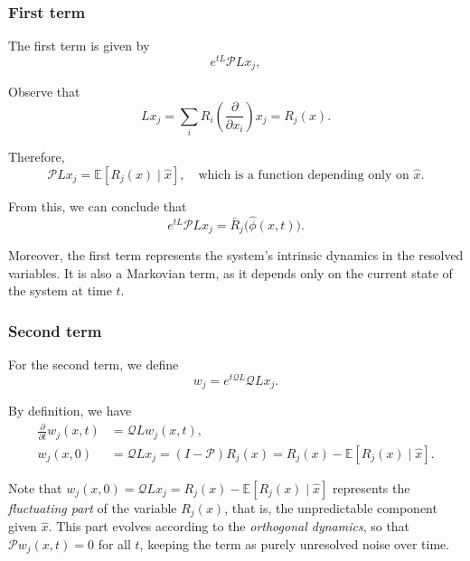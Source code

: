 \documentclass[12pt]{article}
\begin{document}
\subsubsection{First term}
The first term is given by
\begin{equation}
	e^{tL} \mathcal{P}L x_j,
	\label{eq:first-term-mz}
\end{equation}

Observe that
\begin{equation*}
	Lx_j = \sum_i R_i\left(\frac{\partial}{\partial x_i}\right)x_j = R_j(x).
\end{equation*}

Therefore,
\begin{equation*}
	\mathcal{P}Lx_j = \mathbb{E}[R_j(x)\mid \hat{x}], \quad \text{which is a function depending only on $\hat{x}$}.
\end{equation*}

From this, we can conclude that
\begin{equation*}
	e^{tL}\mathcal{P}Lx_j = \bar{R}_j\big(\hat{\phi}(x,t)\big).
\end{equation*}

Moreover, the first term represents the system's intrinsic dynamics in the resolved variables. It is also a Markovian term, as it depends only on the current state of the system at time $t$.

\subsubsection{Second term}
For the second term, we define
\begin{equation*}
	w_j = e^{t\mathcal{Q}L} \mathcal{Q}L x_j.
\end{equation*}

By definition, we have
\begin{align}
	\frac{\partial}{\partial t} w_j(x,t) & = \mathcal{Q}L w_j(x,t),                                                                 \\
	w_j(x,0)                             & = \mathcal{Q}L x_j = (I - \mathcal{P})R_j(x) = R_j(x) - \mathbb{E}[R_j(x) \mid \hat{x}]. 
	\label{eq:mz-orthogonal-dynamics}
\end{align}

Note that $w_j(x,0) = \mathcal{Q}Lx_j = R_j(x) - \mathbb{E}[R_j(x) \mid \hat{x}]$ represents the \textit{fluctuating part} of the variable $R_j(x)$, that is, the unpredictable component given $\hat{x}$. This part evolves according to the \textit{orthogonal dynamics}, so that $\mathcal{P}w_j(x,t) = 0$ for all $t$, keeping the term as purely unresolved noise over time.
\end{document}
